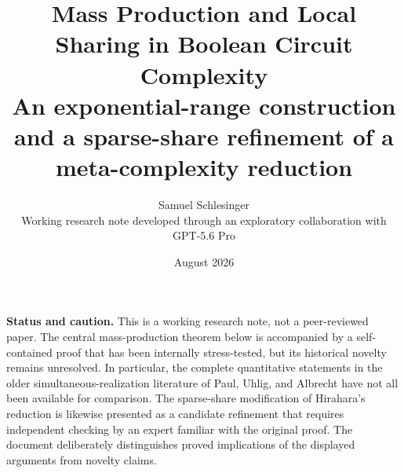 \documentclass[11pt]{article}
\title{\textbf{Mass Production and Local Sharing in Boolean Circuit Complexity}\\[0.4em]
\large An exponential-range construction and a sparse-share refinement of a meta-complexity reduction}
\author{Samuel Schlesinger\\\small Working research note developed through an exploratory collaboration with GPT-5.6 Pro}
\date{August 2026}
\theoremstyle{definition}
\begin{document}
\maketitle

\begin{mdframed}[backgroundcolor=Yellow!10,linecolor=BrickRed,linewidth=1pt]
\textbf{Status and caution.}
This is a working research note, not a peer-reviewed paper.  The central mass-production theorem below is accompanied by a self-contained proof that has been internally stress-tested, but its historical novelty remains unresolved.  In particular, the complete quantitative statements in the older simultaneous-realization literature of Paul, Uhlig, and Albrecht have not all been available for comparison.  The sparse-share modification of Hirahara's reduction is likewise presented as a candidate refinement that requires independent checking by an expert familiar with the original proof.  The document deliberately distinguishes proved implications of the displayed arguments from novelty claims.
\end{mdframed}
\end{document}
